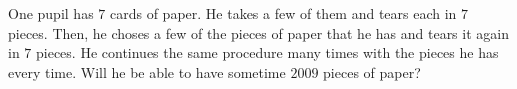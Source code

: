 One pupil has $7$ cards of paper. He takes a few of them and tears each in $7$ pieces. Then, he choses a few of the pieces of  paper that he has and tears it again in $7$ pieces. He continues the same procedure many times with the pieces he has every time. Will he be able to have sometime $2009$ pieces of paper?